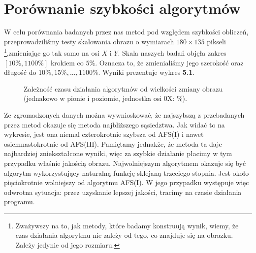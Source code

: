 \section{Porównanie szybkości algorytmów}
W celu porównania badanych przez nas metod pod względem szybkości obliczeń,
przeprowadziliśmy testy skalowania obrazu o wymiarach $180\times135$ pikseli
\footnote{Zważywszy na to, jak metody, które badamy konstruują wynik, wiemy, że 
czas działania algorytmu nie zależy od tego, co znajduje się na obrazku. Zależy 
jedynie od jego rozmiaru.},zmieniając go tak samo na osi $X$ i $Y$. Skala naszych badań objęła zakres
$[10\%, 1100\%]$ krokiem co $5\%$. Oznacza to, że zmienialiśmy jego szerokość
oraz długość do $10\%, 15\%, ... ,1100\%$. Wyniki prezentuje wykres \textbf{5.1}.
\begin{figure}[h!tb]
\begin{center}

\caption{Zależność czasu działania algorytmów od wielkości zmiany obrazu (jednakowo w pionie i poziomie, jednostka osi 0X: $\%$).}
\end{center}
\end{figure}

Ze zgromadzonych danych można wywnioskować, że najszybszą z przebadanych przez
metod okazuje się metoda najbliższego sąsiedztwa. Jak widać to na wykresie, jest
ona niemal czterokrotnie szybsza od AFS(I) i nawet osiemnastokrotnie od AFS(III).
Pamiętamy jednakże, że metoda ta daje najbardziej zniekształcone wyniki, więc
za szybkie działanie płacimy w tym przypadku właśnie jakością obrazu.
Najwolniejszym algorytmem okazuje się być algorytm wykorzystujący naturalną
funkcję sklejaną trzeciego stopnia. Jest około pięciokrotnie wolniejszy od algorytmu AFS(I).
W jego przypadku występuje więc odwrotna sytuacja: przez uzyskanie lepszej jakości,
tracimy na czasie działania programu.

